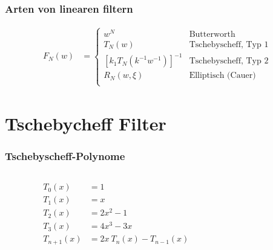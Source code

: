 \documentclass[ngerman, aspectratio=169, xcolor={rgb}]{beamer}
\begin{document}
	\begin{frame}
		\frametitle{Arten von linearen filtern}

		\begin{align*}
			F_N(w) & =
			\begin{cases}
				w^N                            & \text{Butterworth} \\
				T_N(w)                         & \text{Tschebyscheff, Typ 1}  \\
				[k_1 T_N (k^{-1} w^{-1})]^{-1} & \text{Tschebyscheff, Typ 2}  \\
				R_N(w,\xi)                      & \text{Elliptisch (Cauer)}    \\
			\end{cases}
		\end{align*}

	\end{frame}

	\section{Tschebycheff Filter}

	\begin{frame}
		\frametitle{Tschebyscheff-Polynome}


		\begin{columns}
			\begin{column}[T]{0.35\textwidth}

				\begin{align*}
					T_{0}(x)&=1\\
					T_{1}(x)&=x\\
					T_{2}(x)&=2x^{2}-1\\
					T_{3}(x)&=4x^{3}-3x\\
					T_{n+1}(x)&=2x~T_{n}(x)-T_{n-1}(x)
				\end{align*}

			\end{column}
			\begin{column}[T]{0.65\textwidth}

				\begin{center}
					\resizebox{\textwidth}{!}{
					
					}
				\end{center}

			\end{column}
		\end{columns}



	\end{frame}
\end{document}
